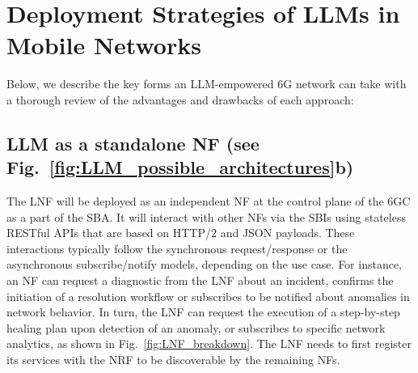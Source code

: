 \section{Deployment Strategies of \glspl{LLM} in Mobile Networks}
\label{sec:LLM_deployments}%
Below, we describe the key forms an \gls{LLM}-empowered 6G network can take with a thorough review of the advantages and drawbacks of each approach:

\subsection{\gls{LLM} as a standalone \gls{NF} (see Fig.~\ref{fig:LLM_possible_architectures}b)}
\label{subsec:standalone_llm}
The \gls{LNF} will be deployed as an independent \gls{NF} at the control plane of the \gls{6GC} as a part of the \gls{SBA}. It will interact with other \glspl{NF} via the \glspl{SBI} using stateless \gls{RESTful} APIs that are based on HTTP/2 and JSON payloads. These interactions typically follow the synchronous request/response or the asynchronous subscribe/notify models, depending on the use case. For instance, an \gls{NF} can request a diagnostic from the \gls{LNF} about an incident, confirms the initiation of a resolution workflow or subscribes to be notified about anomalies in network behavior. In turn, the \gls{LNF} can request the execution of a step-by-step healing plan upon detection of an anomaly, or subscribes to specific network analytics, as shown in Fig.~\ref{fig:LNF_breakdown}. The \gls{LNF} needs to first register its services with the \gls{NRF} to be discoverable by the remaining \glspl{NF}.

